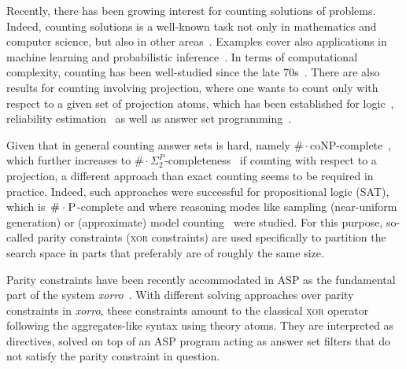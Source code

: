 \documentclass{svproc}
\renewcommand{\P}{\ensuremath{\textsc{P}}\xspace}
\newcommand{\cnt}[0]{\ensuremath{\#}}
\newcommand{\cntc}[0]{\ensuremath{\cnt\cdot}}
\newcommand{\XOR}{\textsc{xor}} %
\newcommand{\sysfont}{\textit}
\newcommand{\xorro}{\sysfont{xorro}}
\begin{document}
Recently, there has been growing interest for counting solutions of problems.
%
Indeed, counting solutions is a well-known task not only in mathematics and computer
science, but also in other
areas~\cite{ChakrabortyMeelVardi16a,DomshlakHoffmann07a,GomesKautzSabharwalSelman08a,SangBeameKautz05a}.
%
%
%
Examples cover also applications in machine learning and probabilistic inference~\cite{ChaviraDarwiche08a}.
%
%
In terms of computational complexity, counting has been well-studied since the
late
70s~\cite{DurandHermannKolaitis05,HemaspaandraVollmer95a,Valiant79,Valiant79b}.
%
There are also results for counting involving projection, where one wants to
count only with respect to a given set of projection atoms,
which has been established for logic~\cite{AzizChuMuise15a,CapelliMengel19,FichteEtAl18,LagniezMarquis19a,GuptaSharmaRoy19a,SharmaRoySoos19a},
reliability estimation~\cite{MeelEtAl17a} as well as
answer set programming~\cite{GebserKaufmannSchaub09a,Aziz15a,FichteHecher19}.
%

Given that in general counting answer sets is hard, namely ${\#\cdot\text{coNP}}$-complete~\cite{FichteEtAl17,DurandHermannKolaitis05}, which further increases
to ${\#\cdot\Sigma_2^P}$-completeness~\cite{FichteHecher19} if counting with respect to a projection,
a different approach than exact counting seems to be required in practice.
%
Indeed, such approaches were successful for propositional logic (SAT), which is~$\cntc\P$-complete and where reasoning modes like sampling (near-uniform generation)
or (approximate) model counting~\cite{gosase07a,chmeva13a,ChakrabortyMV13,SharmaRoySoos19a}
were studied.
%
For this purpose, so-called parity constraints  (\XOR{} constraints) are used specifically to partition the search space in parts that preferably are of roughly the same size.

Parity constraints have been recently accommodated in ASP
as the fundamental part of the system \xorro{}~\cite{DBLP:conf/lpnmr/EverardoJKS19}.
%
With different solving approaches over parity constraints in \xorro{}, these constraints amount to the classical \XOR{} operator following the aggregates-like syntax using theory atoms.
They are interpreted as directives, solved on top of an ASP program acting as answer set filters that do not satisfy the parity constraint in question.
%
\end{document}

